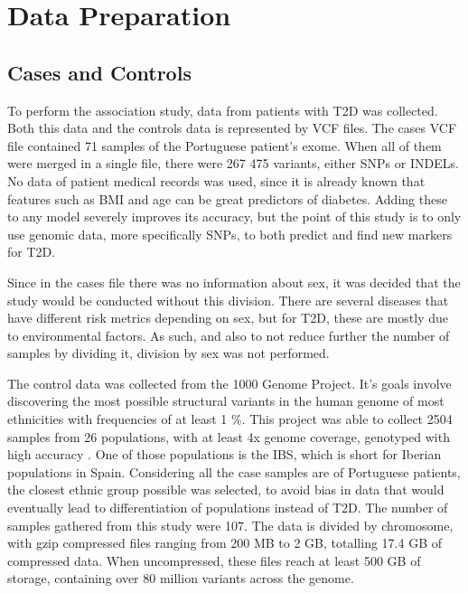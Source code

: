 
\chapter{Data Preparation} \label{chapter:data_preparation}


\section{Cases and Controls}

To perform the association study, data from patients with T2D was collected. Both this data and the controls data is represented by \gls{VCF} files. The cases \gls{VCF} file contained 71 samples of the Portuguese patient's exome. When all of them were merged in a single file, there were 267 475 variants, either \gls{SNP}s or \gls{INDEL}s. No data of patient medical records was used, since it is already known that features such as \gls{BMI} and age can be great predictors of diabetes. Adding these to any model severely improves its accuracy, but the point of this study is to only use genomic data, more specifically \gls{SNP}s, to both predict and find new markers for \gls{T2D}. 

Since in the cases file there was no information about sex, it was decided that the study would be conducted without this division. There are several diseases that have different risk metrics depending on sex, but for \gls{T2D}, these are mostly due to environmental factors. As such, and also to not reduce further the number of samples by dividing it, division by sex was not performed.

The control data was collected from the 1000 Genome Project. It's goals involve discovering the most possible structural variants in the human genome of most ethnicities with frequencies of at least 1 \%. This project was able to collect 2504 samples from 26 populations, with at least 4x genome coverage, genotyped with high accuracy \cite{10002012integrated}. One of those populations is the IBS, which is short for Iberian populations in Spain. Considering all the case samples are of Portuguese patients, the closest ethnic group possible was selected, to avoid bias in data that would eventually lead to differentiation of populations instead of T2D. The number of samples gathered from this study were 107. The data is divided by chromosome, with gzip compressed files ranging from 200 MB to 2 GB, totalling 17.4 GB of compressed data. When uncompressed, these files reach at least 500 GB of storage, containing over 80 million variants across the genome.

